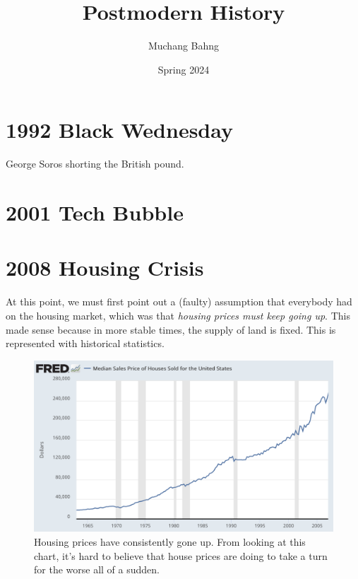 \documentclass{article}
\begin{document}
\title{Postmodern History}
\author{Muchang Bahng}
\date{Spring 2024}

\maketitle
\tableofcontents
\pagebreak

\section{1992 Black Wednesday}

  George Soros shorting the British pound. 

\section{2001 Tech Bubble}


\section{2008 Housing Crisis}

  At this point, we must first point out a (faulty) assumption that everybody had on the housing market, which was that \textit{housing prices must keep going up}. This made sense because in more stable times, the supply of land is fixed. This is represented with historical statistics. 
  
  \begin{figure}[H]
    \centering 
    \includegraphics[scale=0.4]{img/housing.png}
    \caption{Housing prices have consistently gone up. From looking at this chart, it's hard to believe that house prices are doing to take a turn for the worse all of a sudden. } 
    \label{fig:housing}
  \end{figure}
\end{document}
